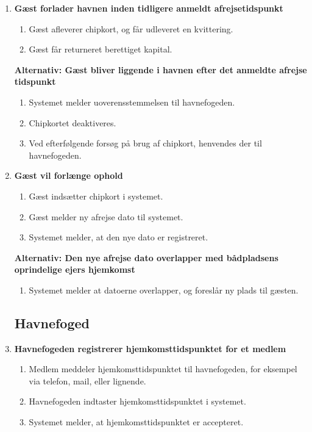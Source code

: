 \begin{enumerate}
    \item{\textbf{Gæst forlader havnen inden tidligere anmeldt afrejsetidspunkt}}
      \begin{enumerate}
        \item Gæst afleverer chipkort, og får udleveret en kvittering.
        \item Gæst får returneret berettiget kapital.
      \end{enumerate}

    \textbf{Alternativ: Gæst bliver liggende i havnen efter det anmeldte afrejse tidspunkt}
      \begin{enumerate}
        \item Systemet melder uoverensstemmelsen til havnefogeden.
        \item Chipkortet deaktiveres.
        \item Ved efterfølgende forsøg på brug af chipkort, henvendes der til havnefogeden.
      \end{enumerate}

    \item{\textbf{Gæst vil forlænge ophold}}
      \begin{enumerate}
        \item Gæst indsætter chipkort i systemet.
        \item Gæst melder ny afrejse dato til systemet.
        \item Systemet melder, at den nye dato er registreret.
      \end{enumerate}

    \textbf{Alternativ: Den nye afrejse dato overlapper med bådpladsens oprindelige ejers hjemkomst}
      \begin{enumerate}
        \item Systemet melder at datoerne overlapper, og foreslår ny plads til gæsten.
      \end{enumerate}

\subsection{Havnefoged}
    \item{\textbf{Havnefogeden registrerer hjemkomsttidspunktet for et medlem}}
      \begin{enumerate}
        \item Medlem meddeler hjemkomsttidspunktet til havnefogeden, for eksempel via telefon, mail, eller lignende.
        \item Havnefogeden indtaster hjemkomsttidspunktet i systemet.
        \item Systemet melder, at hjemkomsttidspunktet er accepteret.
      \end{enumerate}
  

\end{enumerate}
